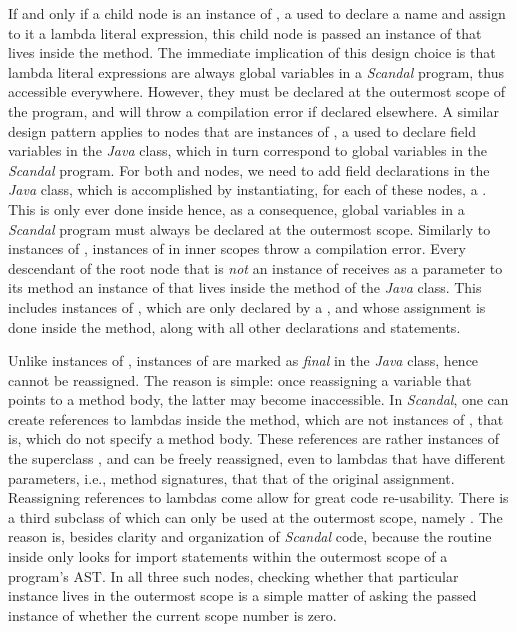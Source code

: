 If and only if a child node is an instance of , a  used to declare a name and assign to it a lambda literal expression, this child node is passed an instance of  that lives inside the  method. The immediate implication of this design choice is that lambda literal expressions are always global variables in a \emph{Scandal} program, thus accessible everywhere. However, they must be declared at the outermost scope of the program, and will throw a compilation error if declared elsewhere. A similar design pattern applies to nodes that are instances of , a  used to declare field variables in the \emph{Java} class, which in turn correspond to global variables in the \emph{Scandal} program. For both  and  nodes, we need to add field declarations in the \emph{Java} class, which is accomplished by instantiating, for each of these nodes, a . This is only ever done inside  hence, as a consequence, global variables in a \emph{Scandal} program must always be declared at the outermost scope. Similarly to instances of , instances of  in inner scopes throw a compilation error. Every descendant of the root node that is \emph{not} an instance of  receives as a parameter to its  method an instance of  that lives inside the  method of the \emph{Java} class. This includes instances of , which are only declared by a , and whose assignment is done inside the  method, along with all other declarations and statements.

Unlike instances of , instances of  are marked as \emph{final} in the \emph{Java} class, hence cannot be reassigned. The reason is simple: once reassigning a variable that points to a method body, the latter may become inaccessible. In \emph{Scandal}, one can create references to lambdas inside the  method, which are not instances of , that is, which do not specify a method body. These references are rather instances of the superclass , and can be freely reassigned, even to lambdas that have different parameters, i.e., method signatures, that that of the original assignment. Reassigning references to lambdas come allow for great code re-usability. There is a third subclass of  which can only be used at the outermost scope, namely . The reason is, besides clarity and organization of \emph{Scandal} code, because the  routine inside  only looks for import statements within the outermost scope of a program's AST. In all three such nodes, checking whether that particular instance lives in the outermost scope is a simple matter of asking the passed instance of  whether the current scope number is zero.

